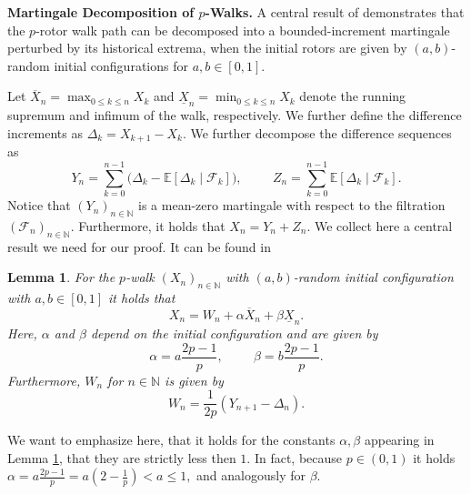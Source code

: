 \documentclass[11pt]{article}
\newtheorem{lemma}{Lemma}[section]
\theoremstyle{remark}
\newcommand{\N}{\mathbb{N}}
\begin{document}
\textbf{Martingale Decomposition of $p$-Walks.} A central result of \cite{HLSH18} demonstrates that the $p$-rotor walk path can be decomposed into a bounded-increment martingale perturbed by its historical extrema, when the initial rotors are given by $(a,b)$-random initial configurations for $a,b\in[0,1]$.

Let $\overline{X}_n = \max_{0 \leq k \leq n} X_k$ and $\underline{X}_n = \min_{0 \leq k \leq n} X_k$ denote the running supremum and infimum of the walk, respectively. We further define the difference increments as $\Delta_k=X_{k+1}-X_k$. We further decompose the difference sequences as
$$Y_n=\sum_{k=0}^{n-1}\Big(\Delta_k-\mathbb{E}[\Delta_k\;|\;\mathcal{F}_k]\Big),\hspace{1cm}Z_n=\sum_{k=0}^{n-1}\mathbb{E}[\Delta_k\;|\;\mathcal{F}_k].$$
Notice that $(Y_n)_{n\in\N}$ is a mean-zero martingale with respect to the filtration $(\mathcal{F}_n)_{n\in\N}.$ Furthermore, it holds that $X_n=Y_n+Z_n$. We collect here a central result we need for our proof. It can be found in \cite[Proposition 2.3.]{HLSH18}
\begin{lemma}\label{lem:martingale-decomp}
    For the $p$-walk $(X_n)_{n\in\N}$ with $(a,b)$-random initial configuration with $a,b\in[0,1]$ it holds that
    $$X_n=W_n+\alpha\overline{X}_n+\beta\underline{X}_n.$$
    Here, $\alpha$ and $\beta$ depend on the initial configuration and are given by
    $$\alpha=a\frac{2p-1}{p},\hspace{1cm}\beta=b\frac{2p-1}{p}.$$
    Furthermore, $W_n$ for $n\in\N$ is given by
    $$W_n=\frac{1}{2p}(Y_{n+1}-\Delta_n).$$
\end{lemma}
We want to emphasize here, that it holds for the constants $\alpha,\beta$ appearing in Lemma \ref{lem:martingale-decomp}, that they are strictly less then $1.$ In fact, because $p\in(0,1)$ it holds
$\alpha=a\frac{2p-1}{p}=a(2-\frac{1}{p})<a\leq 1,$
and analogously for $\beta.$
\end{document}
